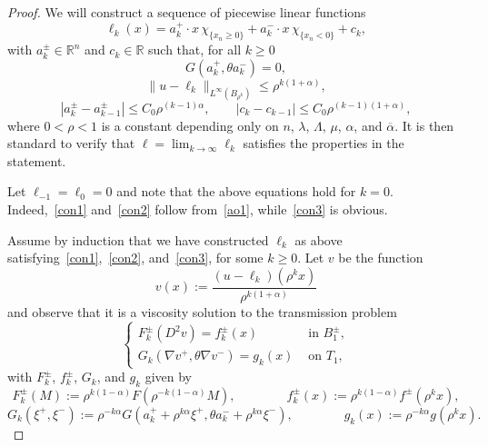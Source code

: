 \documentclass[letter,11pt]{amsart}
\newcommand{\R}{\mathbb{R}}
\newcommand{\chara}[1]{\chi_{#1}}
\theoremstyle{definition}
\numberwithin{equation}{section}
\begin{document}
\begin{proof}
We will construct a sequence of piecewise linear functions
\begin{equation}
\label{con0}
\ell_k(x) = a_k^{+} \cdot x \, \chara{\{x_n \geq 0\}} + a_k^{-} \cdot x \, \chara{\{x_n < 0\}} + c_k,
\end{equation}
with $a_k^{\pm} \in \R^n$ and $c_k \in \R$ such that, for all $k \geq 0$
\begin{equation}
\label{con1}
G(a_k^{+}, \theta a_k^{-}) = 0,
\end{equation}
\begin{equation}
\label{con2}
\|u - \ell_k\|_{L^{\infty}(B_{\rho^{k}})} \leq \rho^{k(1+\alpha)},
\end{equation}
\begin{equation}
\label{con3}
|a_k^{\pm} - a_{k-1}^{\pm}| \leq C_0 \rho^{(k-1)\alpha}, \qquad |c_k - c_{k-1}| \leq C_0 \rho^{(k-1)(1+\alpha)},
\end{equation}
where $0 < \rho < 1$ is a constant depending only on $n$, $\lambda$, $\Lambda$, $\mu$, $\alpha$, and $\overline{\alpha}$.
It is then standard to verify that $\ell = \lim_{k \to \infty} \ell_k$ satisfies the properties in the statement.

\medskip

Let $\ell_{-1} = \ell_0 = 0$ and note that the above equations hold for $k = 0$.
Indeed,~\eqref{con1} and~\eqref{con2} follow from~\eqref{ao1}, while~\eqref{con3} is obvious.

\medskip

Assume by induction that we have constructed $\ell_k$ as above satisfying~\eqref{con1},~\eqref{con2}, and~\eqref{con3}, for some $k \geq 0$.
Let $v$ be the function
\[
v(x) := \frac{(u - \ell_k)(\rho^{k} x)}{\rho^{k(1+\alpha)}}
\]
and observe that it is a viscosity solution to the transmission problem
\begin{equation}
\label{apro1}
\begin{cases}
F_k^{\pm}(D^2 v) = f^{\pm}_k(x) & \text{ in } B_1^{\pm},\\
G_k(\nabla v^{+},\theta \nabla v^{-})
= g_k(x) & \text{ on } T_1,
\end{cases}
\end{equation}
with $F_k^{\pm}$, $f_k^{\pm}$, $G_k$, and $g_k$ given by
\[
F_k^{\pm}(M) := \rho^{k (1-\alpha)} F(\rho^{-k (1-\alpha)}M),
\qquad \qquad 
f^{\pm}_k(x) := \rho^{k (1-\alpha)} f^{\pm}(\rho^{k} x),
\]
\[
G_k(\xi^{+}, \xi^{-}) := \rho^{-k \alpha}G(a_k^{+} + \rho^{k\alpha} \xi^{+}, \theta a_k^{-} + \rho^{k\alpha} \xi^{-}),
\qquad \qquad
g_k(x) := \rho^{-k \alpha} g(\rho^{k} x).
\]


\end{proof}
\end{document}
